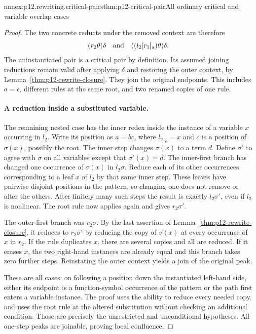 \begin{annexitem}{annex:p12.rewriting.critical-pairs}{thm:p12-critical-pair}{All ordinary critical and variable overlap cases}
\begin{proof}
The two concrete reducts under the removed context are therefore
\[
 (r_2\theta)\delta
 \quad\hbox{and}\quad
 ((l_2[r_1]_a)\theta)\delta.
\]
The uninstantiated pair is a critical pair by definition. Its assumed
joining reductions remain valid after applying \(\delta\) and
restoring the outer context, by Lemma~\ref{thm:p12-rewrite-closure}.
They join the original endpoints. This includes \(a=\epsilon\),
different rules at the same root, and two renamed copies of one rule.

\paragraph{A reduction inside a substituted variable.}
The remaining nested case has the inner redex inside the instance of
a variable \(x\) occurring in \(l_2\). Write its position as
\(a=b c\), where \(l_2|_b=x\) and \(c\) is a position of
\(\sigma(x)\), possibly the root. The inner step changes
\(\sigma(x)\) to a term \(d\). Define \(\sigma'\) to agree
with \(\sigma\) on all variables except that \(\sigma'(x)=d\).
The inner-first branch has changed one occurrence of \(\sigma(x)\)
in \(l_2\sigma\). Reduce each of its other occurrences corresponding
to a leaf \(x\) of \(l_2\) by that same inner step. These leaves
have pairwise disjoint positions in the pattern, so changing one does
not remove or alter the others. After finitely many such steps the
result is exactly \(l_2\sigma'\), even if \(l_2\) is nonlinear.
The root rule now applies again and gives \(r_2\sigma'\).

The outer-first branch was \(r_2\sigma\). By the last assertion of
Lemma~\ref{thm:p12-rewrite-closure}, it reduces to
\(r_2\sigma'\) by reducing the copy of \(\sigma(x)\) at every
occurrence of \(x\) in \(r_2\). If the rule duplicates \(x\),
there are several copies and all are reduced. If it erases \(x\),
the two right-hand instances are already equal and this branch takes
zero further steps. Reinstating the outer context yields a join of
the original peak.

These are all cases: on following a position down the instantiated
left-hand side, either its endpoint is a function-symbol occurrence of
the pattern or the path first enters a variable instance. The proof
uses the ability to reduce every needed copy, and uses the root rule
at the altered substitution without checking an additional condition.
Those are precisely the unrestricted and unconditional hypotheses.
All one-step peaks are joinable, proving local confluence.
\end{proof}
\end{annexitem}

